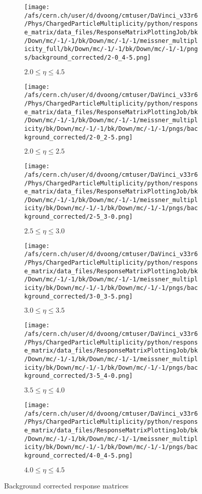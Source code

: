 \begin{figure}
	\centering
	\begin{subfigure}{0.32\textwidth}
		\texttt{[image: /afs/cern.ch/user/d/dvoong/cmtuser/DaVinci\_v33r6/Phys/ChargedParticleMultiplicity/python/response\_matrix/data\_files/ResponseMatrixPlottingJob/bk/Down/mc/-1/-1/bk/Down/mc/-1/-1/meissner\_multiplicity\_full/bk/Down/mc/-1/-1/bk/Down/mc/-1/-1/pngs/background\_corrected/2-0\_4-5.png]}
		\caption{$2.0 \le \eta \le 4.5$}
	\end{subfigure}
	\begin{subfigure}{0.32\textwidth}
		\texttt{[image: /afs/cern.ch/user/d/dvoong/cmtuser/DaVinci\_v33r6/Phys/ChargedParticleMultiplicity/python/response\_matrix/data\_files/ResponseMatrixPlottingJob/bk/Down/mc/-1/-1/bk/Down/mc/-1/-1/meissner\_multiplicity/bk/Down/mc/-1/-1/bk/Down/mc/-1/-1/pngs/background\_corrected/2-0\_2-5.png]}
		\caption{$2.0 \le \eta \le 2.5$}
	\end{subfigure}
	\begin{subfigure}{0.32\textwidth}
		\texttt{[image: /afs/cern.ch/user/d/dvoong/cmtuser/DaVinci\_v33r6/Phys/ChargedParticleMultiplicity/python/response\_matrix/data\_files/ResponseMatrixPlottingJob/bk/Down/mc/-1/-1/bk/Down/mc/-1/-1/meissner\_multiplicity/bk/Down/mc/-1/-1/bk/Down/mc/-1/-1/pngs/background\_corrected/2-5\_3-0.png]}
		\caption{$2.5 \le \eta \le 3.0$}
	\end{subfigure}
	\begin{subfigure}{0.32\textwidth}
		\texttt{[image: /afs/cern.ch/user/d/dvoong/cmtuser/DaVinci\_v33r6/Phys/ChargedParticleMultiplicity/python/response\_matrix/data\_files/ResponseMatrixPlottingJob/bk/Down/mc/-1/-1/bk/Down/mc/-1/-1/meissner\_multiplicity/bk/Down/mc/-1/-1/bk/Down/mc/-1/-1/pngs/background\_corrected/3-0\_3-5.png]}
		\caption{$3.0 \le \eta \le 3.5$}
	\end{subfigure}
	\begin{subfigure}{0.32\textwidth}
		\texttt{[image: /afs/cern.ch/user/d/dvoong/cmtuser/DaVinci\_v33r6/Phys/ChargedParticleMultiplicity/python/response\_matrix/data\_files/ResponseMatrixPlottingJob/bk/Down/mc/-1/-1/bk/Down/mc/-1/-1/meissner\_multiplicity/bk/Down/mc/-1/-1/bk/Down/mc/-1/-1/pngs/background\_corrected/3-5\_4-0.png]}
		\caption{$3.5 \le \eta \le 4.0$}
	\end{subfigure}
	\begin{subfigure}{0.32\textwidth}
		\texttt{[image: /afs/cern.ch/user/d/dvoong/cmtuser/DaVinci\_v33r6/Phys/ChargedParticleMultiplicity/python/response\_matrix/data\_files/ResponseMatrixPlottingJob/bk/Down/mc/-1/-1/bk/Down/mc/-1/-1/meissner\_multiplicity/bk/Down/mc/-1/-1/bk/Down/mc/-1/-1/pngs/background\_corrected/4-0\_4-5.png]}
		\caption{$4.0 \le \eta \le 4.5$}
	\end{subfigure}
	\caption{Background corrected response matrices}
	\label{fig: background corrected response matrices}
\end{figure}